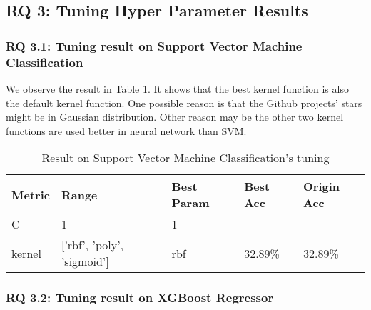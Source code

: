 \subsection{RQ 3: Tuning Hyper Parameter Results}
\subsubsection{RQ 3.1: Tuning result on Support Vector Machine Classification}
We observe the result in Table \ref{tblRQ31}. It shows that the best kernel function is also the default kernel function. One possible reason is that the Github projects' stars might be in Gaussian distribution. Other reason may be the other two kernel functions are used better in neural network than SVM. 

\begin{table}[]
\begin{tabular}{|l|l|l|l|l|}
\hline
{\color[HTML]{000000} \textbf{Metric}} & {\color[HTML]{000000} \textbf{Range}}                 & {\color[HTML]{000000} \textbf{Best Param}} & {\color[HTML]{000000} \textbf{Best Acc}}         & {\color[HTML]{000000} \textbf{Origin Acc}}       \\ \hline
{\color[HTML]{000000} C}               & {\color[HTML]{000000} 1}                              & {\color[HTML]{000000} 1}                   & {\color[HTML]{000000} }                          & {\color[HTML]{000000} }                          \\ \cline{1-3}
{\color[HTML]{000000} kernel}          & {\color[HTML]{000000} {[}'rbf', 'poly', 'sigmoid'{]}} & {\color[HTML]{000000} rbf}                 & \multirow{-2}{*}{{\color[HTML]{000000} 32.89\%}} & \multirow{-2}{*}{{\color[HTML]{000000} 32.89\%}} \\ \hline
\end{tabular}
\label{tblRQ31}
\caption{Result on Support Vector Machine Classification's tuning}
\end{table}

\subsubsection{RQ 3.2: Tuning result on XGBoost Regressor}

